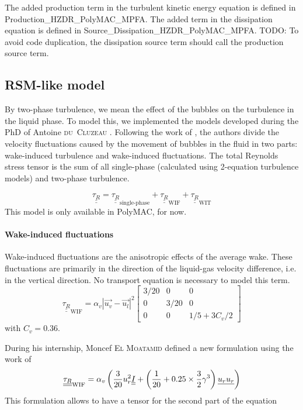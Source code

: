The added production term in the turbulent kinetic energy equation is defined in Production_HZDR_PolyMAC_MPFA. The added term in the dissipation equation is defined in Source_Dissipation_HZDR_PolyMAC_MPFA. TODO: To avoid code duplication, the dissipation source term should call the production source term.

\subsection{RSM-like model}\label{subsec:RSM}
By two-phase turbulence, we mean the effect of the bubbles on the turbulence in the liquid phase. To model this, we implemented the models developed during the PhD of Antoine \textsc{du~Cluzeau} \cite{DuCluzeau2019, Cluzeau2019, Cluzeau2019a}. Following the work of \cite{Risso2018}, the authors divide the velocity fluctuations caused by the movement of bubbles in the fluid in two parts: wake-induced turbulence and wake-induced fluctuations. The total Reynolds stress tensor is the sum of all single-phase (calculated using 2-equation turbulence models) and two-phase turbulence.

\begin{equation}
	\underline{\underline{\tau_R}} 	=
	      \underline{\underline{\tau_R}}_{\text{single-phase}}
		+ \underline{\underline{\tau_R}}_{\text{WIF}}
		+ \underline{\underline{\tau_R}}_{\text{WIT}}
\end{equation}
This model is only available in PolyMAC, for now.

\paragraph{Wake-induced fluctuations}\mbox{}

Wake-induced fluctuations are the anisotropic effects of the average wake. These fluctuations are primarily in the direction of the liquid-gas velocity difference, i.e. in the vertical direction. No transport equation is necessary to model this term.
\begin{equation}
	\underline{\underline{\tau_R}}_{\text{WIF}} =
	\alpha_v |\overrightarrow{u_v}-\overrightarrow{u_l}|^2
	\begin{bmatrix}
		3/20 & 0 & 0 \\
		0 & 3/20 & 0 \\
		0 & 0 & 1/5+3C_v/2
	\end{bmatrix}
\end{equation}
with $C_v = 0.36$.

During his internship, Moncef \textsc{El Moatamid} defined a new formulation using the work of \cite{Biesheuvel1984}
\begin{equation}
	\underline{\underline{\tau_R}}_{\text{WIF}} =
	\alpha_v \left( \frac{3}{20}u_r^2 \underline{\underline{I}} + \left( \frac{1}{20}+0.25\times{}\frac{3}{2}\gamma^3 \right)\underline{u_r}\underline{u_r} \right)
\end{equation}
This formulation allows to have a tensor for the second part of the equation

